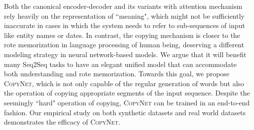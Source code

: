 Both the canonical encoder-decoder and its variants with attention mechanism rely heavily on the representation of ``meaning", which might not be sufficiently inaccurate in cases in which  the system needs to refer to sub-sequences of input like entity names or dates. In contrast, the copying mechanism is closer to the rote memorization in language processing of human being, deserving a different modeling strategy in neural network-based models. We argue that it will benefit many Seq2Seq tasks to have an elegant unified model that can accommodate both understanding and rote memorization. Towards this goal, we propose \textsc{CopyNet}, which is not only capable of the regular generation of words but also the operation of copying appropriate segments of the input sequence. Despite the seemingly ``hard" operation of copying, \textsc{CopyNet} can be trained in an end-to-end fashion. Our empirical study on both synthetic datasets and real world datasets demonstrates the efficacy of \textsc{CopyNet}.       
 




